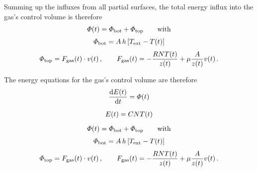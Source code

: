 \documentclass[a4paper,12pt,%
onecolumn,oneside,%
british%
]{memoir}
\newcommand*{\di}{\mathrm{d}}%
\renewcommand*{\|}[1][]{\nonscript\:#1\vert\nonscript\:\mathopen{}}
\newcommand*{\yvis}{\mu} %
\newcommand*{\yhea}{h} %
\newcommand*{\dt}{\di t}
\newcommand*{\yN}{N}
\newcommand*{\yE}{E}
\newcommand*{\yH}{\varPhi}%
\newcommand*{\yFgas}{F_{\textrm{gas}}}
\newcommand*{\yFatm}{F_{\textrm{atm}}}
\newcommand*{\yT}{T}%
\newcommand*{\yTe}{\yT_{\text{ext}}}%
\begin{document}
\medskip

Summing up the influxes from all partial surfaces, the total energy influx into the gas's control volume is therefore
\begin{equation}
  \label{eq:gas_energy_influx}
  \begin{gathered}
    \yH(t) = \yH_{\textrm{bot}} + \yH_{\textrm{top}}
    \qquad\text{with}
    \\[\jot]
    \yH_{\textrm{bot}} = A\,\yhea\,[\yTe-\yT(t)]
    \\[\jot]
    \yH_{\textrm{top}} =  \yFgas(t) \cdot v(t) \,,
    \qquad
      \yFgas(t) = -\frac{R \yN \yT(t)}{z(t)}  + \yvis \frac{A}{z(t)} v(t)
    \,.
  \end{gathered}
\end{equation}

\medskip

The energy equations for the gas's control volume are therefore
\begin{equation}
  \label{eq:gas_equations}
  \begin{gathered}
  \frac{\di \yE(t)}{\dt} = \yH(t)
  \\[2\jot]
    \yE(t) = C\yN\yT(t)
    \\[2\jot]
    \yH(t) = \yH_{\textrm{bot}} + \yH_{\textrm{top}}
    \qquad\text{with}
    \\[\jot]
    \yH_{\textrm{bot}} = A\,\yhea\,[\yTe-\yT(t)]
    \\[\jot]
    \yH_{\textrm{top}} =  \yFgas(t) \cdot v(t) \,,
    \qquad
      \yFgas(t) = -\frac{R \yN \yT(t)}{z(t)}  + \yvis \frac{A}{z(t)} v(t) \,.
  \end{gathered}
\end{equation}

\vspace{2\bigskipamount}
\end{document}
